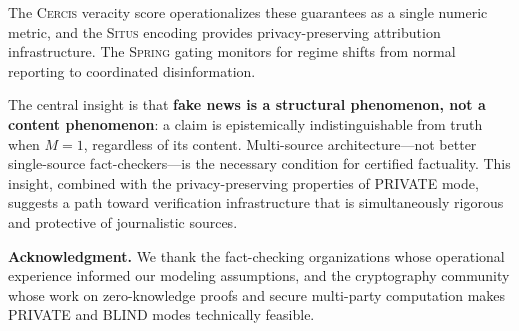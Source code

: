 \documentclass[11pt,a4paper]{article}
\theoremstyle{definition}
\newcommand{\Situs}{\textsc{Situs}}
\newcommand{\Spring}{\textsc{Spring}}
\newcommand{\Cercis}{\textsc{Cercis}}
\newcommand{\VISprivate}{\textsc{PRIVATE}}
\newcommand{\VISblind}{\textsc{BLIND}}
\begin{document}
The \Cercis{} veracity score operationalizes these guarantees as a single numeric metric, and the \Situs{} encoding provides privacy-preserving attribution infrastructure. The \Spring{} gating monitors for regime shifts from normal reporting to coordinated disinformation.

The central insight is that \textbf{fake news is a structural phenomenon, not a content phenomenon}: a claim is epistemically indistinguishable from truth when $M = 1$, regardless of its content. Multi-source architecture---not better single-source fact-checkers---is the necessary condition for certified factuality. This insight, combined with the privacy-preserving properties of \VISprivate{} mode, suggests a path toward verification infrastructure that is simultaneously rigorous and protective of journalistic sources.

\vspace{1cm}
\noindent\textbf{Acknowledgment.} We thank the fact-checking organizations whose operational experience informed our modeling assumptions, and the cryptography community whose work on zero-knowledge proofs and secure multi-party computation makes \VISprivate{} and \VISblind{} modes technically feasible.
\end{document}
